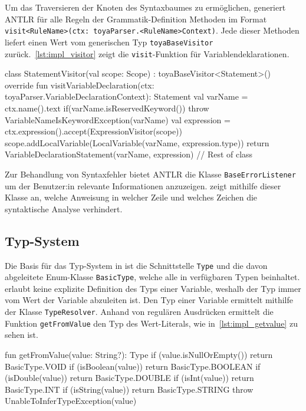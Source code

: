 Um das Traversieren der Knoten des Syntaxbaumes zu ermöglichen, generiert ANTLR für alle Regeln der Grammatik-Definition Methoden im Format \texttt{visit<RuleName>(ctx: toyaParser.<RuleName>Context)}. Jede dieser Methoden liefert einen Wert vom generischen Typ \texttt{toyaBaseVisitor} zurück.~\autoref{lst:impl_visitor} zeigt die \texttt{visit}-Funktion für Variablendeklarationen.

\begin{KotlinCode}[numbers=none, caption={\visitor-Funktion zum Erstellen eines \texttt{VariableDeclarationStatement}}, label=lst:impl_visitor]
class StatementVisitor(val scope: Scope) : toyaBaseVisitor<Statement>() {
    override fun visitVariableDeclaration(ctx: toyaParser.VariableDeclarationContext): Statement {
        val varName = ctx.name().text
        if(varName.isReservedKeyword()) throw VariableNameIsKeywordException(varName)
        val expression = ctx.expression().accept(ExpressionVisitor(scope))
        scope.addLocalVariable(LocalVariable(varName, expression.type))
        return VariableDeclarationStatement(varName, expression)
    }
    // Rest of class
}
\end{KotlinCode}

Zur Behandlung von Syntaxfehler bietet ANTLR die Klasse \texttt{BaseErrorListener} um der Benutzer:in relevante Informationen anzuzeigen. \Toya zeigt mithilfe dieser Klasse an, welche Anweisung in welcher Zeile und welches Zeichen die syntaktische Analyse verhindert.

\subsection{Typ-System}

Die Basis für das Typ-System in \toya ist die Schnittstelle \texttt{Type} und die davon abgeleitete Enum-Klasse \texttt{BasicType}, welche alle in \toya verfügbaren Typen beinhaltet. \Toya erlaubt keine explizite Definition des Typs einer Variable, weshalb der Typ immer vom Wert der Variable abzuleiten ist. Den Typ einer Variable ermittelt \toya mithilfe der Klasse \texttt{TypeResolver}. Anhand von regulären Ausdrücken ermittelt die Funktion \texttt{getFromValue} den Typ des Wert-Literals, wie in~\autoref{lst:impl_getvalue} zu sehen ist.

\begin{KotlinCode}[numbers=none, caption={Methode zur Ermittlung des Typs bei Wert-Literalen}, label={lst:getFromValue}, label=lst:impl_getvalue]
fun getFromValue(value: String?): Type {
    if (value.isNullOrEmpty()) return BasicType.VOID
    if (isBoolean(value)) return BasicType.BOOLEAN
    if (isDouble(value)) return BasicType.DOUBLE
    if (isInt(value)) return BasicType.INT
    if (isString(value)) return BasicType.STRING
    throw UnableToInferTypeException(value)
}
\end{KotlinCode}

